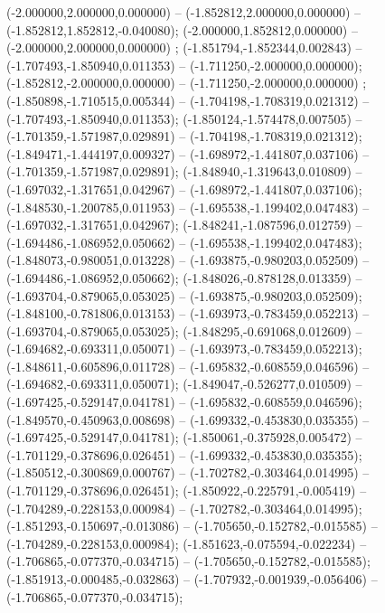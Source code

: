  (-2.000000,2.000000,0.000000) -- (-1.852812,2.000000,0.000000) -- (-1.852812,1.852812,-0.040080);
 (-2.000000,1.852812,0.000000) -- (-2.000000,2.000000,0.000000) ;
 (-1.851794,-1.852344,0.002843) -- (-1.707493,-1.850940,0.011353) -- (-1.711250,-2.000000,0.000000);
 (-1.852812,-2.000000,0.000000) -- (-1.711250,-2.000000,0.000000) ;
 (-1.850898,-1.710515,0.005344) -- (-1.704198,-1.708319,0.021312) -- (-1.707493,-1.850940,0.011353);
 (-1.850124,-1.574478,0.007505) -- (-1.701359,-1.571987,0.029891) -- (-1.704198,-1.708319,0.021312);
 (-1.849471,-1.444197,0.009327) -- (-1.698972,-1.441807,0.037106) -- (-1.701359,-1.571987,0.029891);
 (-1.848940,-1.319643,0.010809) -- (-1.697032,-1.317651,0.042967) -- (-1.698972,-1.441807,0.037106);
 (-1.848530,-1.200785,0.011953) -- (-1.695538,-1.199402,0.047483) -- (-1.697032,-1.317651,0.042967);
 (-1.848241,-1.087596,0.012759) -- (-1.694486,-1.086952,0.050662) -- (-1.695538,-1.199402,0.047483);
 (-1.848073,-0.980051,0.013228) -- (-1.693875,-0.980203,0.052509) -- (-1.694486,-1.086952,0.050662);
 (-1.848026,-0.878128,0.013359) -- (-1.693704,-0.879065,0.053025) -- (-1.693875,-0.980203,0.052509);
 (-1.848100,-0.781806,0.013153) -- (-1.693973,-0.783459,0.052213) -- (-1.693704,-0.879065,0.053025);
 (-1.848295,-0.691068,0.012609) -- (-1.694682,-0.693311,0.050071) -- (-1.693973,-0.783459,0.052213);
 (-1.848611,-0.605896,0.011728) -- (-1.695832,-0.608559,0.046596) -- (-1.694682,-0.693311,0.050071);
 (-1.849047,-0.526277,0.010509) -- (-1.697425,-0.529147,0.041781) -- (-1.695832,-0.608559,0.046596);
 (-1.849570,-0.450963,0.008698) -- (-1.699332,-0.453830,0.035355) -- (-1.697425,-0.529147,0.041781);
 (-1.850061,-0.375928,0.005472) -- (-1.701129,-0.378696,0.026451) -- (-1.699332,-0.453830,0.035355);
 (-1.850512,-0.300869,0.000767) -- (-1.702782,-0.303464,0.014995) -- (-1.701129,-0.378696,0.026451);
 (-1.850922,-0.225791,-0.005419) -- (-1.704289,-0.228153,0.000984) -- (-1.702782,-0.303464,0.014995);
 (-1.851293,-0.150697,-0.013086) -- (-1.705650,-0.152782,-0.015585) -- (-1.704289,-0.228153,0.000984);
 (-1.851623,-0.075594,-0.022234) -- (-1.706865,-0.077370,-0.034715) -- (-1.705650,-0.152782,-0.015585);
 (-1.851913,-0.000485,-0.032863) -- (-1.707932,-0.001939,-0.056406) -- (-1.706865,-0.077370,-0.034715);

